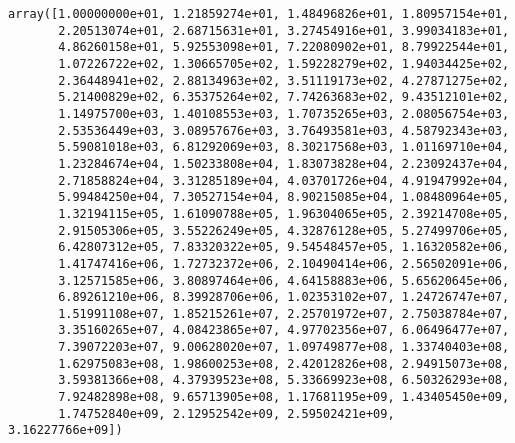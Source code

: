 \documentclass[11pt]{article}
\makeatletter
\newcommand{\boxspacing}{\kern\kvtcb@left@rule\kern\kvtcb@boxsep}
\newcommand{\prompt}[4]{
        \ttfamily\llap{{\color{#2}[#3]:\hspace{3pt}#4}}\vspace{-\baselineskip}
    }
\makeatother
\begin{document}
            \begin{tcolorbox}[breakable, size=fbox, boxrule=.5pt, pad at break*=1mm, opacityfill=0]
\prompt{Out}{outcolor}{11}{\boxspacing}
\begin{Verbatim}[commandchars=\\\{\}]
array([1.00000000e+01, 1.21859274e+01, 1.48496826e+01, 1.80957154e+01,
       2.20513074e+01, 2.68715631e+01, 3.27454916e+01, 3.99034183e+01,
       4.86260158e+01, 5.92553098e+01, 7.22080902e+01, 8.79922544e+01,
       1.07226722e+02, 1.30665705e+02, 1.59228279e+02, 1.94034425e+02,
       2.36448941e+02, 2.88134963e+02, 3.51119173e+02, 4.27871275e+02,
       5.21400829e+02, 6.35375264e+02, 7.74263683e+02, 9.43512101e+02,
       1.14975700e+03, 1.40108553e+03, 1.70735265e+03, 2.08056754e+03,
       2.53536449e+03, 3.08957676e+03, 3.76493581e+03, 4.58792343e+03,
       5.59081018e+03, 6.81292069e+03, 8.30217568e+03, 1.01169710e+04,
       1.23284674e+04, 1.50233808e+04, 1.83073828e+04, 2.23092437e+04,
       2.71858824e+04, 3.31285189e+04, 4.03701726e+04, 4.91947992e+04,
       5.99484250e+04, 7.30527154e+04, 8.90215085e+04, 1.08480964e+05,
       1.32194115e+05, 1.61090788e+05, 1.96304065e+05, 2.39214708e+05,
       2.91505306e+05, 3.55226249e+05, 4.32876128e+05, 5.27499706e+05,
       6.42807312e+05, 7.83320322e+05, 9.54548457e+05, 1.16320582e+06,
       1.41747416e+06, 1.72732372e+06, 2.10490414e+06, 2.56502091e+06,
       3.12571585e+06, 3.80897464e+06, 4.64158883e+06, 5.65620645e+06,
       6.89261210e+06, 8.39928706e+06, 1.02353102e+07, 1.24726747e+07,
       1.51991108e+07, 1.85215261e+07, 2.25701972e+07, 2.75038784e+07,
       3.35160265e+07, 4.08423865e+07, 4.97702356e+07, 6.06496477e+07,
       7.39072203e+07, 9.00628020e+07, 1.09749877e+08, 1.33740403e+08,
       1.62975083e+08, 1.98600253e+08, 2.42012826e+08, 2.94915073e+08,
       3.59381366e+08, 4.37939523e+08, 5.33669923e+08, 6.50326293e+08,
       7.92482898e+08, 9.65713905e+08, 1.17681195e+09, 1.43405450e+09,
       1.74752840e+09, 2.12952542e+09, 2.59502421e+09, 3.16227766e+09])
\end{Verbatim}
\end{tcolorbox}
        
\end{document}

